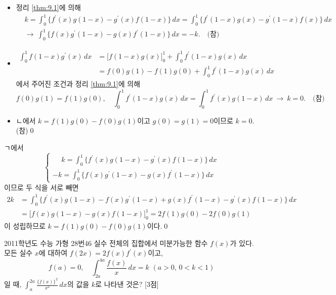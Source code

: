 \documentclass{article}
\begin{document}
\begin{sol}[풀이 1]
	\begin{itemize}
		\item[ㄱ.] 정리 \ref{thm:9.1}에 의해
			\[
				\begin{aligned}
					&k=\int_0^1\{f^{\prime}(x)g(1-x)-g^{\prime}(x)f(1-x)\}\,dx=\int_0^1\{f^{\prime}(1-x)g(x)-g^{\prime}(1-x)f(x)\}\,dx\\[3pt]
		&\longrightarrow~\int_0^1\{f(x)g^{\prime}(1-x)-g(x)f^{\prime}(1-x)\}\,dx=-k.\quad\text{(참)}
				\end{aligned}
			\]
		\item[ㄴ.] \[
				\begin{aligned}
					\int_0^1f(1-x)g^{\prime}(x)\,dx&=\biggl[f(1-x)g(x)\biggr]_0^1+\int_0^1f^{\prime}(1-x)g(x)\,dx\\[3pt]
					&=f(0)g(1)-f(1)g(0)+\int_0^1f^{\prime}(1-x)g(x)\,dx
				\end{aligned}
			\]
			에서 주어진 조건과 정리 \ref{thm:9.1}에 의해
			\[
				f(0)g(1)=f(1)g(0),\quad\int_0^1f^{\prime}(1-x)g(x)\,dx=\int_0^1f^{\prime}(x)g(1-x)\,dx~\longrightarrow~k=0.\quad\text{(참)}
			\]
		\item[ㄷ.] ㄴ에서 $k=f(1)g(0)-f(0)g(1)$이고 $g(0)=g(1)=0$이므로 $k=0$. (참)\qed
	\end{itemize}
\end{sol}

\begin{sol}[풀이 2]
	ㄱ에서
	\[
		\begin{cases}
			\phantom{-}k=\displaystyle\int_0^1\{f^{\prime}(x)g(1-x)-g^{\prime}(x)f(1-x)\}\,dx\\[6pt]
			-k=\displaystyle\int_0^1\{f(x)g^{\prime}(1-x)-g(x)f^{\prime}(1-x)\}\,dx
		\end{cases}
	\]
	이므로 두 식을 서로 빼면
	\[
		\begin{aligned}
			2k&=\int_0^1\{f^{\prime}(x)g(1-x)-f(x)g^{\prime}(1-x)+g(x)f^{\prime}(1-x)-g^{\prime}(x)f(1-x)\}\,dx\\[3pt]
			&=\biggl[f(x)g(1-x)-g(x)f(1-x)\biggr]_0^1=2f(1)g(0)-2f(0)g(1)
		\end{aligned}
	\]
	이 성립하므로 $k=f(1)g(0)-f(0)g(1)$이다.\qed
\end{sol}

\newpage
\begin{prob}{2011학년도 수능 가형 28번}{46}
	실수 전체의 집합에서 미분가능한 함수 $f(x)$가 있다. 모든 실수 $x$에 대하여 $f(2x)=2f(x)f^{\prime}(x)$이고,
	\[
		f(a)=0,\quad\int_{2a}^{4a}\frac{f(x)}{x}\,dx=k\,\,(a>0,\,0<k<1)
	\]
	일 때, $\displaystyle\int_a^{2a}\frac{\{f(x)\}^2}{x^2}\,dx$의 값을 $k$로 나타낸 것은? [3점]
\end{prob}
\end{document}
